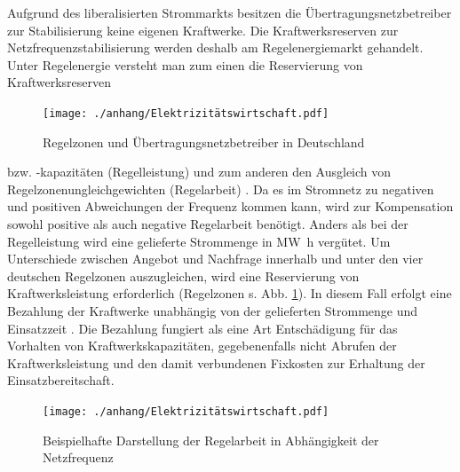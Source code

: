 		Aufgrund des liberalisierten Strommarkts besitzen die Übertragungsnetzbetreiber zur Stabilisierung keine eigenen Kraftwerke.
		Die Kraftwerksreserven zur Netzfrequenzstabilisierung werden deshalb am Regelenergiemarkt gehandelt.
		Unter Regelenergie versteht man zum einen die Reservierung von Kraftwerksreserven
		\begin{figure}
			\centering
			\texttt{[image: ./anhang/Elektrizitätswirtschaft.pdf]}
			\caption{Regelzonen und Übertragungsnetzbetreiber in Deutschland \parencite{Elektrizitätswirtschaft}}
			\label{Abb. Regelzonen Deutschland}
		\end{figure}
		bzw. -kapazitäten (Regelleistung) und zum anderen den Ausgleich von Regelzonenungleichgewichten (Regelarbeit) \parencite{Elektrizitätswirtschaft}.
		Da es im Stromnetz zu negativen und positiven Abweichungen der Frequenz kommen kann, wird zur Kompensation sowohl positive als auch negative Regelarbeit benötigt.
		Anders als bei der Regelleistung wird eine gelieferte Strommenge in \si{\mega\watt\hour} vergütet.
		Um Unterschiede zwischen Angebot und Nachfrage innerhalb und unter den vier deutschen Regelzonen auszugleichen, wird eine Reservierung von Kraftwerksleistung erforderlich (Regelzonen s. Abb. \ref{Abb. Regelzonen Deutschland}). 
		In diesem Fall erfolgt eine Bezahlung der Kraftwerke unabhängig von der gelieferten Strommenge und Einsatzzeit \parencite{Elektrizitätswirtschaft}. 
		Die Bezahlung fungiert als eine Art Entschädigung für das Vorhalten von Kraftwerkskapazitäten, gegebenenfalls nicht Abrufen der Kraftwerksleistung und den damit verbundenen Fixkosten zur Erhaltung der Einsatzbereitschaft.   
		
		\begin{figure} [H]
			\centering
			\label{Abb. Beispielhafte Darstellung der Regelenergie in Abhängigkeit der Netzfrequenz}
			\texttt{[image: ./anhang/Elektrizitätswirtschaft.pdf]}
			\caption{Beispielhafte Darstellung der Regelarbeit in Abhängigkeit der Netzfrequenz \parencite{Elektrizitätswirtschaft}}
		\end{figure}
	
